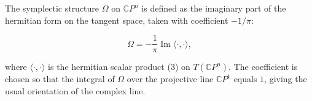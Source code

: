 The symplectic structure $\Omega$ on $\mathbb{C}P^n$ is defined as the imaginary part of the hermitian form on the tangent space, taken with coefficient $-1/\pi$:

$$\Omega = -\frac{1}{\pi} \operatorname{Im} \langle \cdot, \cdot \rangle,$$

where $\langle \cdot, \cdot \rangle$ is the hermitian scalar product (3) on $T(\mathbb{C}P^n)$. The coefficient is chosen so that the integral of $\Omega$ over the projective line $\mathbb{C}P^1$ equals $1$, giving the usual orientation of the complex line.
